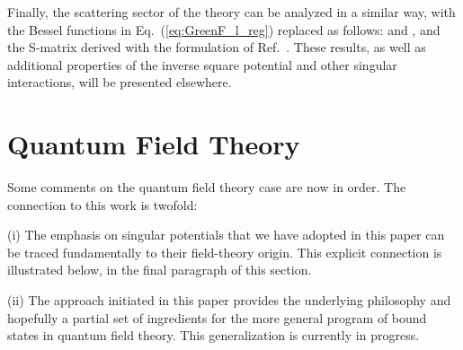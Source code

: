 \documentclass[a4paper,preprint,draft,showpacs,amsmath,amsfonts,amssymb,aps,prd]{revtex4}%
\begin{document}
Finally, the scattering sector of the theory can be analyzed in a similar way,
with the Bessel functions in Eq.~(\ref{eq:GreenF_l_reg})
replaced as follows:
\coordHE{}
and
\coordHE{}, 
and the S-matrix derived with the formulation
of Ref.~\cite{ger:80}. 
These results, as well as additional properties of the inverse square potential
and other singular interactions, will be presented elsewhere.


\section{Quantum Field Theory}
\label{sec:QFT}

Some comments on the quantum field theory case are now in order. The
connection to this work is twofold:

(i) The emphasis on singular potentials 
that we have adopted in this paper can be traced
fundamentally to their field-theory origin.
This explicit connection is illustrated below, in the final paragraph of this section.

(ii) The approach initiated in this paper provides the underlying philosophy
and hopefully a partial set of ingredients for the more general program of bound states in 
quantum field theory.
This generalization is currently in progress.
\end{document}
